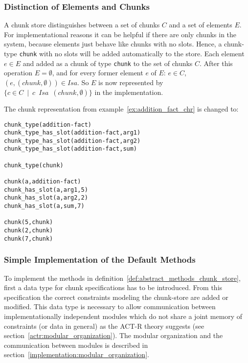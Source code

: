 \subsubsection{Distinction of Elements and Chunks}
\label{distinction_elements_chunks}

A chunk store distinguishes between a set of chunks $C$ and a set of elements $E$. For implementational reasons it can be helpful if there are only chunks in the system, because elements just behave like chunks with no slots. Hence, a chunk-type \lstinline|chunk| with no slots will be added automatically to the store. Each element $e \in E$ and added as a chunk of type \lstinline|chunk| to the set of chunks $C$. After this operation $E = \emptyset$, and for every former element $e$ of $E$: $e \in C$, $(e,(chunk,\emptyset)) \in Isa$. So $E$ is now represented by $\{ c \in C \enspace | \enspace c \enspace Isa \enspace (chunk,\emptyset) \}$ in the implementation.

\begin{example}
The chunk representation from example~\ref{ex:addition_fact_chr} is changed to:

\begin{lstlisting}
chunk_type(addition-fact)
chunk_type_has_slot(addition-fact,arg1)
chunk_type_has_slot(addition-fact,arg2)
chunk_type_has_slot(addition-fact,sum)

chunk_type(chunk)

chunk(a,addition-fact)
chunk_has_slot(a,arg1,5)
chunk_has_slot(a,arg2,2)
chunk_has_slot(a,sum,7)

chunk(5,chunk)
chunk(2,chunk)
chunk(7,chunk)
\end{lstlisting}
\end{example}


\subsubsection{Simple Implementation of the Default Methods}
\label{chunk_specification}

To implement the methods in definition~\ref{def:abstract_methods_chunk_store}, first a data type for chunk specifications has to be introduced. From this specification the correct constraints modeling the chunk-store are added or modified. This data type is necessary to allow communication between implementationally independent modules which do not share a joint memory of constraints (or data in general) as the ACT-R theory suggests (see section~\ref{actr:modular_organization}). The modular organization and the communication between modules is described in section~\ref{implementation:modular_organization}. 

